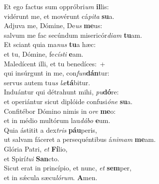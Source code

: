 \evenverse Et ego factus sum oppróbri\textit{um} \textbf{il}lis:~\*\\
\evenverse vidérunt me, et movérunt cá\textit{pi}\textit{ta} \textbf{su}a.\\
\oddverse Adjuva me, Dómine, De\textit{us} \textbf{me}us:~\*\\
\oddverse salvum me fac secúndum misericór\textit{di}\textit{am} \textbf{tu}am.\\
\evenverse Et sciant quia ma\textit{nus} \textbf{tu}a hæc:~\*\\
\evenverse et tu, Dómine, fe\textit{cí}\textit{sti} \textbf{e}am.\\
\oddverse Maledícent illi, et tu benedíces:~+\\
\oddverse  qui insúrgunt in me, con\textit{fun}\textbf{dán}tur:~\*\\
\oddverse servus autem tu\textit{us} \textit{læ}\textbf{tá}bitur.\\
\evenverse Induántur qui détrahunt mihi, \textit{pu}\textbf{dó}re:~\*\\
\evenverse et operiántur sicut diplóide confusi\textit{ó}\textit{ne} \textbf{su}a.\\
\oddverse Confitébor Dómino nimis in o\textit{re} \textbf{me}o:~\*\\
\oddverse et in médio multórum lau\textit{dá}\textit{bo} \textbf{e}um.\\
\evenverse Quia ástitit a dex\textit{tris} \textbf{páu}peris,~\*\\
\evenverse ut salvam fáceret a persequéntibus á\textit{ni}\textit{mam} \textbf{me}am.\\
\oddverse Glória Patri, \textit{et} \textbf{Fí}lio,~\*\\
\oddverse et Spirí\textit{tu}\textit{i} \textbf{San}cto.\\
\evenverse Sicut erat in princípio, et nunc, \textit{et} \textbf{sem}per,~\*\\
\evenverse et in sǽcula sæcu\textit{ló}\textit{rum}. \textbf{A}men.\\
